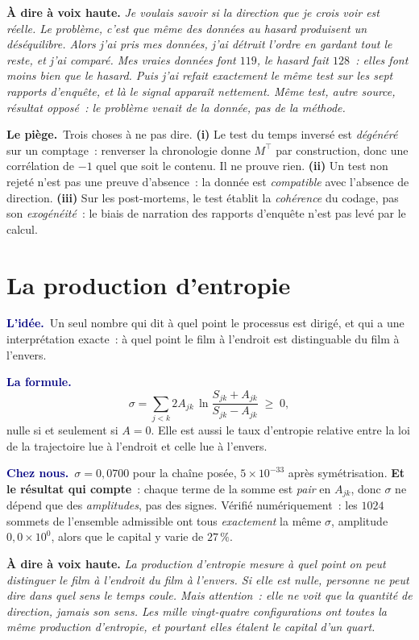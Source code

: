 \documentclass[11pt,a4paper]{article}
\newcommand{\lidee}[1]{\smallskip\noindent\textcolor{navy}{\textbf{L'idée.}}\ #1\par}
\newcommand{\laformule}[1]{\smallskip\noindent\textcolor{navy}{\textbf{La formule.}}\ #1\par}
\newcommand{\cheznous}[1]{\smallskip\noindent\textcolor{navy}{\textbf{Chez nous.}}\ #1\par}
\newcommand{\lepiege}[1]{\smallskip\noindent\textcolor{accent}{\textbf{Le piège.}}\ #1\par}
\newcommand{\laphrase}[1]{\begin{phrasebox}\textbf{À dire à voix haute.} \emph{#1}\end{phrasebox}}
\begin{document}
\laphrase{Je voulais savoir si la direction que je crois voir est réelle. Le problème, c'est
que même des données au hasard produisent un déséquilibre. Alors j'ai pris mes données, j'ai
détruit l'ordre en gardant tout le reste, et j'ai comparé. Mes vraies données font
$119$, le hasard fait $128$~: elles font moins bien que le hasard. Puis j'ai refait
exactement le même test sur les sept rapports d'enquête, et là le signal apparaît nettement.
Même test, autre source, résultat opposé~: le problème venait de la donnée, pas de la
méthode.}

\lepiege{Trois choses à ne pas dire. \textbf{(i)} Le test du \og temps inversé\fg{} est
\emph{dégénéré} sur un comptage~: renverser la chronologie donne $M^{\top}$ par
construction, donc une corrélation de $-1$ quel que soit le contenu. Il ne prouve rien.
\textbf{(ii)} Un test non rejeté n'est pas une preuve d'absence~: la donnée est
\emph{compatible} avec l'absence de direction. \textbf{(iii)} Sur les post-mortems, le test
établit la \emph{cohérence} du codage, pas son \emph{exogénéité}~: le biais de narration des
rapports d'enquête n'est pas levé par le calcul.}

\section{La production d'entropie}

\lidee{Un seul nombre qui dit à quel point le processus est dirigé, et qui a une
interprétation exacte~: à quel point le film à l'endroit est distinguable du film à
l'envers.}

\laformule{
\[
  \sigma=\sum_{j<k} 2A_{jk}\,\ln\!\frac{S_{jk}+A_{jk}}{S_{jk}-A_{jk}} \;\ge\; 0,
\]
nulle si et seulement si $A=0$. Elle est aussi le taux d'entropie relative entre la loi de
la trajectoire lue à l'endroit et celle lue à l'envers.}

\cheznous{$\sigma=0{,}0700$ pour la chaîne posée, $5\times10^{-33}$ après symétrisation.
\textbf{Et le résultat qui compte}~: chaque terme de la somme est \emph{pair} en $A_{jk}$,
donc $\sigma$ ne dépend que des \emph{amplitudes}, pas des signes. Vérifié numériquement~:
les $1024$ sommets de l'ensemble admissible ont tous \emph{exactement} la même $\sigma$,
amplitude $0{,}0\times10^{0}$, alors que le capital y varie de $27\,\%$.}

\laphrase{La production d'entropie mesure à quel point on peut distinguer le film à
l'endroit du film à l'envers. Si elle est nulle, personne ne peut dire dans quel sens le
temps coule. Mais attention~: elle ne voit que la \emph{quantité} de direction, jamais son
\emph{sens}. Les mille vingt-quatre configurations ont toutes la même production d'entropie,
et pourtant elles étalent le capital d'un quart.}
\end{document}
